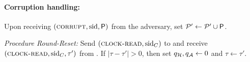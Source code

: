 \begin{cccFunctionality}
    \paragraph{Corruption handling:}
    \begin{cccItemize}[nosep]
        \item Upon receiving $(\textsc{corrupt}, \mathrm{sid}, \mathsf{P})$ from the adversary, set $\mathcal{P}' \gets \mathcal{P}' \cup \mathsf{P}$.
    \end{cccItemize}

    \medskip\emph{Procedure Round-Reset:}
    Send $(\textsc{clock-read}, \mathrm{sid}_C)$ to \funcClock and receive $(\textsc{clock-read}, \allowbreak \mathrm{sid}_C, \tau')$ from \funcClock. If $|\tau - \tau' | > 0$, then set $q_\mathcal{H}, q_\mathcal{A} \gets 0$ and $\tau \gets \tau'$.
\end{cccFunctionality}
